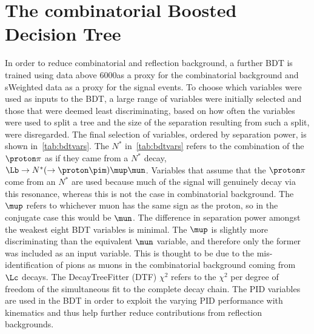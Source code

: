 \section{The combinatorial Boosted Decision Tree}
\label{Sec:BDT}
In order to reduce combinatorial and reflection background, a further BDT is trained using \Lbpi data above 6000\mevcc as a proxy for the combinatorial background and sWeighted \LbKjpsi data as a proxy for the signal events.
To choose which variables were used as inputs to the BDT, a large range of variables were initially selected and those that were deemed least discriminating, based on how often the variables were used to split a tree and the size of the separation resulting from such a split, were disregarded. The final selection of variables, ordered by separation power, is shown in~\autoref{tab:bdtvars}. The $N^{*}$ in~\autoref{tab:bdtvars} refers to the combination of the $\proton\pi$ as if they came from a $N^{*}$ decay, $\Lb\to N^{*}(\to\proton\pim)\mup\mun$. Variables that assume that the $\proton\pi$  come from an $N^{*}$ are used because much of the signal will genuinely decay via this resonance, whereas this is not the case in combinatorial background. The $\mup$ \dllmupi refers to whichever muon has the same sign as the proton, so in the conjugate case this would be $\mun$. The difference in separation power amongst the weakest eight BDT variables is minimal. The $\mup$ \dllmupi is slightly more discriminating than the equivalent $\mun$ \dllmupi variable, and therefore only the former was included as an input variable. This is thought to be due to the mis-identification of pions as muons in the combinatorial background coming from $\Lc$ decays. The DecayTreeFitter (\gls{DTF}) $\chi^{2}$ refers to the $\chi^{2}$ per degree of freedom of the simultaneous fit to the complete decay chain. The PID variables are used in the BDT in order to exploit the varying PID performance with kinematics and thus help further reduce contributions from reflection backgrounds. %

